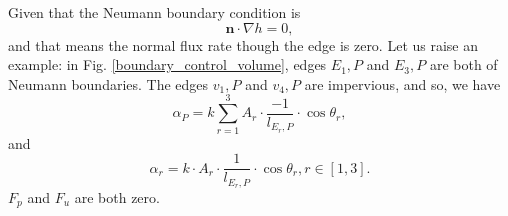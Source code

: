 \documentclass{article}        %
\begin{document}
Given that the Neumann boundary condition is
\begin{equation}
\bm{n}\cdot \nabla h = 0,
\end{equation}
and that means the normal flux rate though the edge is zero. Let us raise an example: in Fig. \ref{boundary_control_volume}, edges $E_1, P$ and $E_3, P$ are both of Neumann boundaries. The edges $v_1, P$ and $v_4, P$ are impervious, and so, we have
\begin{equation}
	\alpha_P = k\sum_{r = 1}^{3}A_r \cdot \frac{-1}{l_{E_r, P}}\cdot \cos{\theta_r},
\end{equation}
and
\begin{equation}
	\alpha_r = k \cdot A_{r}\cdot \frac{1}{l_{E_r, P}}\cdot \cos{\theta_{r}}, r \in [1, 3]. 
\end{equation}
$F_p$ and $F_u$ are both zero.

 
\end{document}
